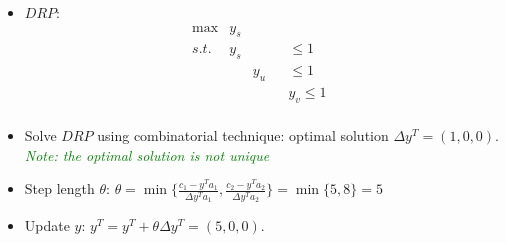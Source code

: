 \documentclass[mathserif]{beamer}
\begin{document}
{\begin{small}
\begin{itemize}
\[\begin{array}{rrrrrrrrrrrrrrrrrl}
\end{array} \nonumber
\]
%   
\item $DRP$:   
\[
\begin{array}{rrrrrrrrrl}
 \max & y_s &      & &            &\\
s.t. & y_s  &      & &     \leq 1 &  \\
     &      & y_u  & &     \leq 1 &  \\
     &      &      & & y_v \leq 1 &  \\  
\end{array} \nonumber
\]

  


\item  Solve $DRP$  using combinatorial technique: optimal solution  $\Delta {y^T} = (1, 0, 0)$. \textcolor{green}{{\it Note: the optimal solution  is not unique}}

\item Step length $\theta$: $\theta = \min \{ \frac{ {c_1 - y^Ta_1} }{ {\Delta y^T a_1}  }, \frac{ {c_2 - y^Ta_2} }{ {\Delta y^T a_2}  }  \} = \min\{ 5, 8\} = 5$

\item Update ${y}$: ${y^T=y^T}+\theta \Delta {y^T}  = (5, 0, 0)$. 



\end{itemize}
\end{small}}
\end{document}
